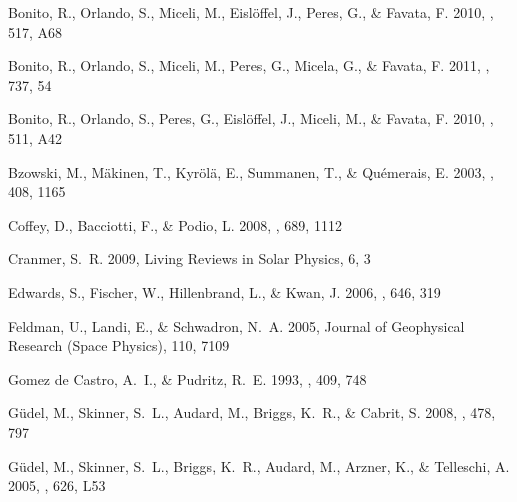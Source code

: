 \documentclass[manuscript]{aastex}
\begin{document}
\begin{thebibliography}{53}
{Bonito}, R., {Orlando}, S., {Miceli}, M., {Eisl{\"o}ffel}, J., {Peres}, G., \&
  {Favata}, F. 2010{}, \aap, 517, A68

{Bonito}, R., {Orlando}, S., {Miceli}, M., {Peres}, G., {Micela}, G., \&
  {Favata}, F. 2011, \apj, 737, 54

{Bonito}, R., {Orlando}, S., {Peres}, G., {Eisl{\"o}ffel}, J., {Miceli}, M., \&
  {Favata}, F. 2010{}, \aap, 511, A42

{Bzowski}, M., {M{\"a}kinen}, T., {Kyr{\"o}l{\"a}}, E., {Summanen}, T., \&
  {Qu{\'e}merais}, E. 2003, \aap, 408, 1165

{Coffey}, D., {Bacciotti}, F., \& {Podio}, L. 2008, \apj, 689, 1112

{Cranmer}, S.~R. 2009, Living Reviews in Solar Physics, 6, 3

{Edwards}, S., {Fischer}, W., {Hillenbrand}, L., \& {Kwan}, J. 2006, \apj, 646,
  319

{Feldman}, U., {Landi}, E., \& {Schwadron}, N.~A. 2005, Journal of Geophysical
  Research (Space Physics), 110, 7109

{Gomez de Castro}, A.~I., \& {Pudritz}, R.~E. 1993, \apj, 409, 748

{G{\"u}del}, M., {Skinner}, S.~L., {Audard}, M., {Briggs}, K.~R., \& {Cabrit},
  S. 2008, \aap, 478, 797

{G{\"u}del}, M., {Skinner}, S.~L., {Briggs}, K.~R., {Audard}, M., {Arzner}, K.,
  \& {Telleschi}, A. 2005, \apjl, 626, L53


\end{thebibliography}
\end{document}
